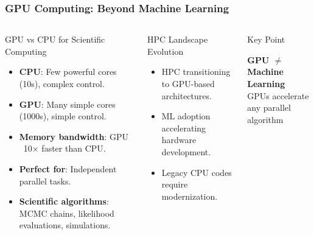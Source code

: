 \documentclass[aspectratio=169]{beamer}
\begin{document}

\begin{frame}
    \frametitle{GPU Computing: Beyond Machine Learning}
    \begin{columns}
        \begin{block}{GPU vs CPU for Scientific Computing}
            \begin{itemize}
                \item \textbf{CPU}: Few powerful cores (10s), complex control.
                \item \textbf{GPU}: Many simple cores (1000s), simple control.
                \item \textbf{Memory bandwidth}: GPU ~10× faster than CPU.
                \item \textbf{Perfect for}: Independent parallel tasks.
                \item \textbf{Scientific algorithms}: MCMC chains, likelihood evaluations, simulations.
            \end{itemize}
        \end{block}
        \begin{block}{HPC Landscape Evolution}
            \begin{itemize}
                \item HPC transitioning to GPU-based architectures.
                \item ML adoption accelerating hardware development.
                \item Legacy CPU codes require modernization.
            \end{itemize}
        \end{block}
        \begin{block}{Key Point}
            \begin{center}
                \textbf{GPU $\neq$ Machine Learning}\\
                GPUs accelerate any parallel algorithm
            \end{center}
        \end{block}
    \end{columns}
\end{frame}
\end{document}

